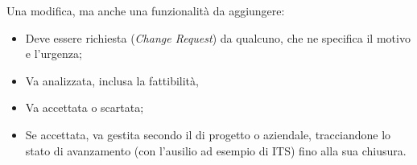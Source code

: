 \documentclass[../main]{subfiles}
\begin{document}
Una modifica, ma anche una funzionalità da aggiungere:
\begin{itemize}
    \item Deve essere richiesta (\textit{Change Request}) da qualcuno, che ne specifica il motivo e l'urgenza;
    \item Va analizzata, inclusa la fattibilità,
    \item Va accettata o scartata;
    \item Se accettata, va gestita secondo il  di progetto o aziendale, tracciandone lo stato di avanzamento (con l'ausilio ad esempio di ITS) fino alla sua chiusura.
\end{itemize}
\end{document}
